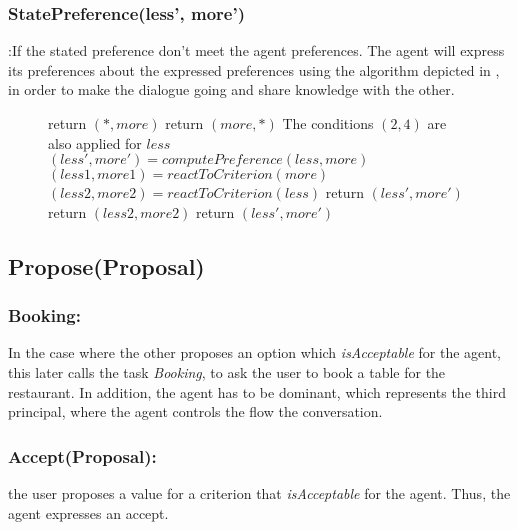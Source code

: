 \documentclass{llncs}
\begin{document}
 		\subsubsection{StatePreference(less', more')} :If the stated preference don't meet the agent preferences. The agent will express its preferences about the expressed preferences using the algorithm depicted in , in order to make the dialogue going and share knowledge with the other.
 	\begin{figure}[h]
 		\begin{algorithmic}[1]\small
 			
 			\State return $(*, more)$
 			\EndIf
 			\State return $(more, *) $
 			\EndIf
 			\State The conditions $(2,4)$ are also applied for $less$
 			\State $(less',more') = computePreference(less,more)$
 			\State $(less1,more1)= reactToCriterion(more)$
 			\State $(less2,more2)= reactToCriterion(less)$
 			\State return $(less',more')$
 			\Else  
 			return $(less2,more2)$
 			\EndIf
 			\EndIf
 			\EndIf
 			\State return $(less', more')$
 			\EndFunction
 			
 		\end{algorithmic}
 		\vskip 8pt
 	\end{figure}
 
 \subsection{Propose(Proposal)}
 
 \subsubsection{Booking:} In the case where the other proposes an option which \emph{isAcceptable} for the agent, this later calls the task \textit{Booking}, to ask the user to book a table for the restaurant. In addition, the agent has to be dominant, which represents the third principal, where the agent controls the flow the conversation.
 
 \subsubsection{Accept(Proposal):} the user proposes a value for a criterion that \emph{isAcceptable} for the agent. Thus, the agent expresses an accept.
 
\end{document}
